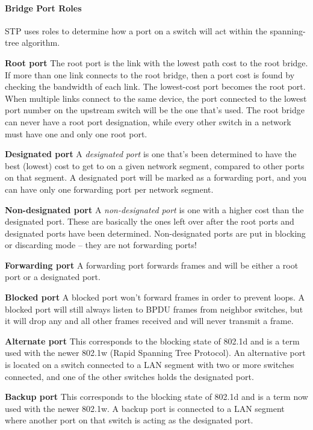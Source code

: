 \documentclass[b5paper,11pt]{memoir}
\begin{document}
\paragraph{Bridge Port Roles}

STP uses roles to determine how a port on a switch will act within the
spanning-tree algorithm.

\textbf{Root port} The root port is the link with the lowest path cost
to the root bridge. If more than one link connects to the root bridge,
then a port cost is found by checking the bandwidth of each link. The
lowest-cost port becomes the root port. When multiple links connect to
the same device, the port connected to the lowest port number on the
upstream switch will be the one that's used. The root bridge can never
have a root port designation, while every other switch in a network must
have one and only one root port.

\textbf{Designated port} A \emph{designated port} is one that's been
determined to have the best (lowest) cost to get to on a given network
segment, compared to other ports on that segment. A designated port will
be marked as a forwarding port, and you can have only one forwarding
port per network segment.

\textbf{Non-designated port} A \emph{non-designated port} is one with a
higher cost than the designated port. These are basically the ones left
over after the root ports and designated ports have
been determined.
Non-designated ports are put in blocking or discarding mode -- they are
not forwarding ports!

\textbf{Forwarding port} A forwarding port forwards frames and will be
either a root port or a designated port.

\textbf{Blocked port} A blocked port won't forward frames in order to
prevent loops. A blocked port will still always listen to BPDU frames
from neighbor switches, but it will drop any and all other frames
received and will never transmit a frame.

\textbf{Alternate port} This corresponds to the blocking state of 802.1d
and is a term used with the newer 802.1w (Rapid Spanning Tree Protocol).
An alternative port is located on a switch connected to a LAN segment
with two or more switches connected, and one of the other switches holds
the designated port.

\textbf{Backup port} This corresponds to the blocking state of 802.1d
and is a term now used with the newer 802.1w. A backup port is connected
to a LAN segment where another port on that switch is acting as the
designated port.
\end{document}
